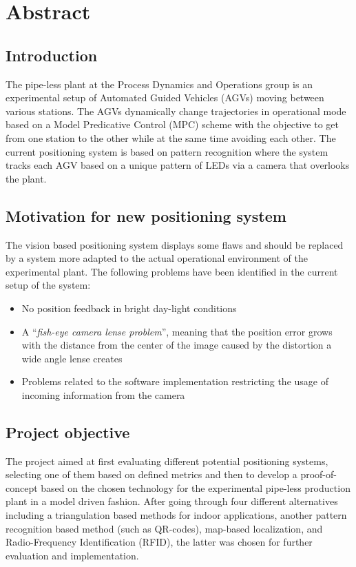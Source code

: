 \section*{Abstract} %

\subsection*{Introduction}
The pipe-less plant at the Process Dynamics and Operations group is an experimental setup of Automated Guided Vehicles (AGVs) moving between various stations. The AGVs dynamically change trajectories in operational mode based on a Model Predicative Control (MPC) scheme with the objective to get from one station to the other while at the same time avoiding each other. The current positioning system is based on pattern recognition where the system tracks each AGV based on a unique pattern of LEDs via a camera that overlooks the plant. 
\subsection*{Motivation for new positioning system
}
The vision based positioning system displays some flaws and should be replaced by a system more adapted to the actual operational environment of the experimental plant. The following problems have been identified in the current setup of the system: 

\begin{itemize}
	\item No position feedback in bright day-light conditions 
	\item A ``\textit{fish-eye camera lense problem}'', meaning that the position error grows with the distance from the center of the image caused by the distortion a wide angle lense creates
	\item Problems related to the software implementation restricting the usage of incoming information from the camera
\end{itemize}

\subsection*{Project objective
}
The project aimed at first evaluating different potential positioning systems, selecting one of them based on defined metrics and then to develop a proof-of-concept based on the chosen technology for the experimental pipe-less production plant in a model driven fashion. After going through four different alternatives including a triangulation based methods for indoor applications, another pattern recognition based method (such as QR-codes), map-based localization, and Radio-Frequency Identification (RFID), the latter was chosen for further evaluation and implementation.
